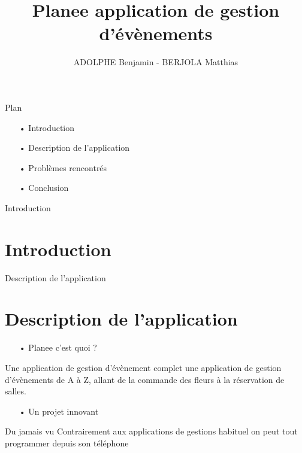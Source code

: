 \documentclass[11pt]{beamer}
\author{ADOLPHE Benjamin - BERJOLA Matthias}
\begin{document}
\begin{frame}
\title{Planee application de gestion d'évènements}
\titlepage
\end{frame}

\begin{frame}{Plan}
\begin{itemize}
\item[•] Introduction \pause
\item[•] Description de l'application  \pause
\item[•] Problèmes rencontrés  \pause
\item[•]  Conclusion 

\end{itemize}
\end{frame}

\begin{frame}{Introduction}
\section{Introduction}

\begin{itemize}

\end{itemize}

\end{frame}

\begin{frame}{Description de l'application}
\section{Description de l'application}
\begin{itemize}
\item[•] Planee c'est quoi ? \pause
\end{itemize}
\begin{mybox}{Une application de gestion d'évènement complet}
une application de gestion d'évènements de A à Z, allant de la commande des fleurs à la réservation de salles.
	
\end{mybox}
\pause
\begin{itemize}
\item[•] Un projet innovant \pause
\end{itemize}
\begin{mybox}{Du jamais vu}
Contrairement aux applications de gestions habituel on peut tout programmer depuis son téléphone 
	
\end{mybox}



\end{frame}
\end{document}
